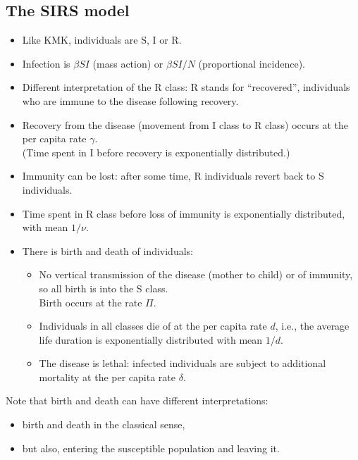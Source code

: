 \subsection{The SIRS model}
\begin{itemize}
\item Like KMK, individuals are S, I or R.
\item Infection is $\beta SI$ (mass action) or $\beta SI/N$ (proportional incidence).
\item Different interpretation of the R class: R stands for ``recovered'', individuals who are immune to the disease following recovery.
\item Recovery from the disease (movement from I class to R class) occurs at the per capita rate $\gamma$.\\ (Time spent in I before recovery is exponentially distributed.)
\item Immunity can be lost: after some time, R individuals revert back to S individuals.
\item Time spent in R class before loss of immunity is exponentially distributed, with mean $1/\nu$.
\item There is birth and death of individuals:
\begin{itemize}
\item No vertical transmission of the disease (mother to child) or of immunity, so all birth is into the S class.\\ Birth occurs at the rate $\Pi$.
\item Individuals in all classes die of at the per capita rate $d$, i.e., the average life duration is exponentially distributed with mean $1/d$.
\item The disease is lethal: infected individuals are subject to additional mortality at the per capita rate $\delta$.
\end{itemize}
\end{itemize}
Note that birth and death can have different interpretations:
\begin{itemize}
\item birth and death in the classical sense,
\item but also, entering the susceptible population and leaving it.
\end{itemize}

